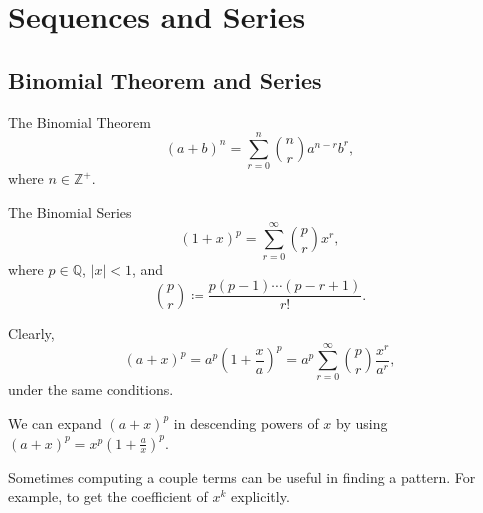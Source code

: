 \documentclass[oneside]{book}
\begin{document}
\chapter{Sequences and Series}
\section{Binomial Theorem and Series}
\begin{theorem}{The Binomial Theorem}{}
  \[(a+b)^n=\sum_{r=0}^{n}{\binom{n}{r}a^{n-r}b^r},\]
  where \(n \in \mathbb{Z}^{+}\).
\end{theorem}
\begin{theorem}{The Binomial Series}{}
  \[(1+x)^{p}=\sum_{r=0}^{\infty}{\binom{p}{r}x^r},\]
  where \(p \in \mathbb{Q}\), \(\lvert x \rvert<1\), and
  \[\binom{p}{r}\coloneq \frac{p(p-1)\cdots(p-r+1)}{r!}.\]
\end{theorem}
\begin{corollary}{}{}
  Clearly,
  \[(a+x)^p=a^p\left(1+\frac{x}{a}\right)^p=a^p \sum_{r=0}^{\infty}{\binom{p}{r}\frac{x^r}{a^r}},\]
  under the same conditions.
\end{corollary}
\begin{fact}
  We can expand \((a+x)^p\) in descending powers of \(x\) by using \((a+x)^p=x^p\left(1+\frac{a}{x}\right)^p\).
\end{fact}
\begin{note}
  Sometimes computing a couple terms can be useful in finding a pattern. For example, to get the coefficient of \(x^k\) explicitly.
\end{note}
\newpage
\end{document}
